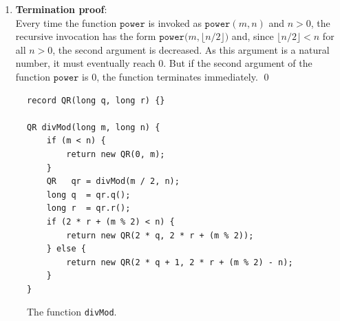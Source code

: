 \begin{enumerate}
\begin{enumerate}
            Then there exists a number $k \in \mathbb{N}$ such that $n = 2 \cdot k + 1$ and we have
            $\lfloor n / 2 \rfloor = k$.  In this case we have:
            \\[0.2cm]
            \hspace*{1.3cm}
            $ 
            \begin{array}{lcl}
            \mathtt{power}(m,n) & = & \mathtt{power}(m,k) \cdot \mathtt{power}(m,k) \cdot m  \\[0.2cm]
                                & \stackrel{\mathrm{IV}}{=} & m^k \cdot m^k \cdot m  \\[0.2cm]
                                & = & m^{2\cdot k+1} \\[0.2cm]
                                & = & m^{n}.
            \end{array}
            $
      \end{enumerate}
      As we have shown that $\mathtt{power}(m,n) = m^n$ in both cases, the induction step is finished. \mycheck
\item \textbf{Termination proof}: \\
      Every time the function $\mathtt{power}$ is invoked as $\mathtt{power}(m, n)$ and $n > 0$, the recursive
      invocation has the form $\mathtt{power}\bigl(m, \lfloor n / 2 \rfloor\bigr)$ and, since
    $\lfloor n / 2 \rfloor < n$ for all $n > 0$, the second
      argument is decreased.  As this argument is a natural number, it must eventually reach $0$.  But if the
      second argument of the function $\mathtt{power}$ is $0$, the function terminates immediately. \mycheck
      \qed
\end{enumerate}

\begin{figure}[!h]
  \centering
\begin{verbatim}
record QR(long q, long r) {}

QR divMod(long m, long n) {
    if (m < n) {
        return new QR(0, m);
    }
    QR   qr = divMod(m / 2, n);
    long q  = qr.q();
    long r  = qr.r();
    if (2 * r + (m % 2) < n) {
        return new QR(2 * q, 2 * r + (m % 2));
    } else {
        return new QR(2 * q + 1, 2 * r + (m % 2) - n);
    }
}
\end{verbatim}
\vspace*{-0.3cm}
  \caption{The function \texttt{divMod}.}
  \label{fig:div_mod}
\end{figure} 


